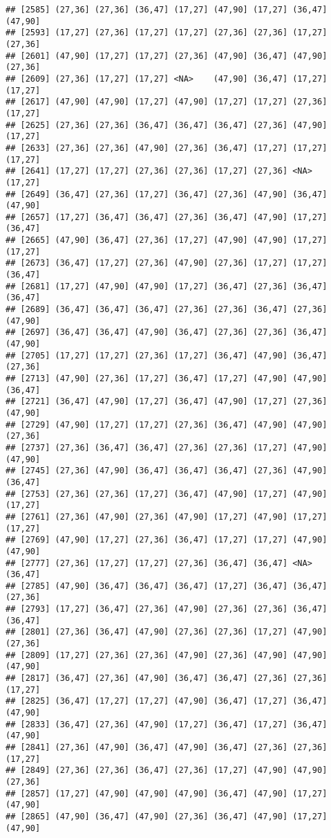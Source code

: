 \documentclass[12pt,]{article}
\begin{document}
\begin{verbatim}
## [2585] (27,36] (27,36] (36,47] (17,27] (47,90] (17,27] (36,47] (47,90]
## [2593] (17,27] (27,36] (17,27] (17,27] (27,36] (27,36] (17,27] (27,36]
## [2601] (47,90] (17,27] (17,27] (27,36] (47,90] (36,47] (47,90] (27,36]
## [2609] (27,36] (17,27] (17,27] <NA>    (47,90] (36,47] (17,27] (17,27]
## [2617] (47,90] (47,90] (17,27] (47,90] (17,27] (17,27] (27,36] (17,27]
## [2625] (27,36] (27,36] (36,47] (36,47] (36,47] (27,36] (47,90] (17,27]
## [2633] (27,36] (27,36] (47,90] (27,36] (36,47] (17,27] (17,27] (17,27]
## [2641] (17,27] (17,27] (27,36] (27,36] (17,27] (27,36] <NA>    (17,27]
## [2649] (36,47] (27,36] (17,27] (36,47] (27,36] (47,90] (36,47] (47,90]
## [2657] (17,27] (36,47] (36,47] (27,36] (36,47] (47,90] (17,27] (36,47]
## [2665] (47,90] (36,47] (27,36] (17,27] (47,90] (47,90] (17,27] (17,27]
## [2673] (36,47] (17,27] (27,36] (47,90] (27,36] (17,27] (17,27] (36,47]
## [2681] (17,27] (47,90] (47,90] (17,27] (36,47] (27,36] (36,47] (36,47]
## [2689] (36,47] (36,47] (36,47] (27,36] (27,36] (36,47] (27,36] (47,90]
## [2697] (36,47] (36,47] (47,90] (36,47] (27,36] (27,36] (36,47] (47,90]
## [2705] (17,27] (17,27] (27,36] (17,27] (36,47] (47,90] (36,47] (27,36]
## [2713] (47,90] (27,36] (17,27] (36,47] (17,27] (47,90] (47,90] (36,47]
## [2721] (36,47] (47,90] (17,27] (36,47] (47,90] (17,27] (27,36] (47,90]
## [2729] (47,90] (17,27] (17,27] (27,36] (36,47] (47,90] (47,90] (27,36]
## [2737] (27,36] (36,47] (36,47] (27,36] (27,36] (17,27] (47,90] (47,90]
## [2745] (27,36] (47,90] (36,47] (36,47] (36,47] (27,36] (47,90] (36,47]
## [2753] (27,36] (27,36] (17,27] (36,47] (47,90] (17,27] (47,90] (17,27]
## [2761] (27,36] (47,90] (27,36] (47,90] (17,27] (47,90] (17,27] (17,27]
## [2769] (47,90] (17,27] (27,36] (36,47] (17,27] (17,27] (47,90] (47,90]
## [2777] (27,36] (17,27] (17,27] (27,36] (36,47] (36,47] <NA>    (36,47]
## [2785] (47,90] (36,47] (36,47] (36,47] (17,27] (36,47] (36,47] (27,36]
## [2793] (17,27] (36,47] (27,36] (47,90] (27,36] (27,36] (36,47] (36,47]
## [2801] (27,36] (36,47] (47,90] (27,36] (27,36] (17,27] (47,90] (27,36]
## [2809] (17,27] (27,36] (27,36] (47,90] (27,36] (47,90] (47,90] (47,90]
## [2817] (36,47] (27,36] (47,90] (36,47] (36,47] (27,36] (27,36] (17,27]
## [2825] (36,47] (17,27] (17,27] (47,90] (36,47] (17,27] (36,47] (47,90]
## [2833] (36,47] (27,36] (47,90] (17,27] (36,47] (17,27] (36,47] (47,90]
## [2841] (27,36] (47,90] (36,47] (47,90] (36,47] (27,36] (27,36] (17,27]
## [2849] (27,36] (27,36] (36,47] (27,36] (17,27] (47,90] (47,90] (27,36]
## [2857] (17,27] (47,90] (47,90] (47,90] (36,47] (47,90] (17,27] (47,90]
## [2865] (47,90] (36,47] (47,90] (27,36] (36,47] (47,90] (17,27] (47,90]

\end{verbatim}
\end{document}
